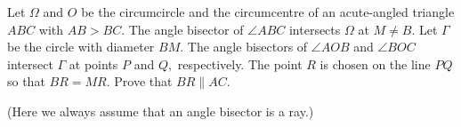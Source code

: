 Let 
$\Omega$
 and 
$O$
 be the circumcircle and the circumcentre of an acute-angled triangle 
$ABC$
 with 
$AB > BC$.
 The angle bisector of 
$\angle ABC$
 intersects 
$\Omega$
 at 
$M \ne B$.
 Let 
$\Gamma$
 be the circle with diameter 
$BM$.
 The angle bisectors of 
$\angle AOB$
 and 
$\angle BOC$
 intersect 
$\Gamma$
 at points 
$P$
 and 
$Q,$
 respectively. The point 
$R$
 is chosen on the line 
$P Q$
 so that 
$BR = MR$.
 Prove that 
$BR\parallel AC$.


(Here we always assume that an angle bisector is a ray.)


